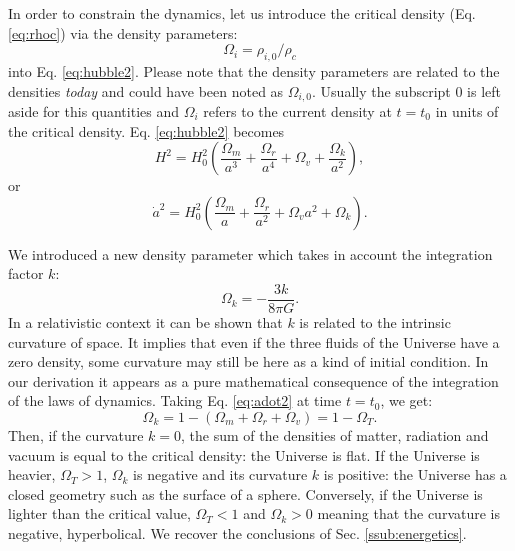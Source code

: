 In order to constrain the dynamics, let us introduce the critical density (Eq. \ref{eq:rhoc}) via the density parameters:
\begin{equation}
	\Omega_{i}=\rho_{i,0}/\rho_c
\end{equation}  
into Eq. \ref{eq:hubble2}. Please note that the density parameters are related to the densities \emph{today} and could have been noted as $\Omega_{i,0}$. Usually the subscript $0$ is left aside for this quantities and $\Omega_i$ refers to the current density at $t=t_0$ in units of the critical density. Eq. \ref{eq:hubble2} becomes
\begin{equation}
	H^2=H_0^2(\frac{\Omega_m}{a^3}+\frac{\Omega_r}{a^4}+\Omega_v+\frac{\Omega_k}{a^2}),
\end{equation}
or
\begin{equation}
	{\dot a}^2=H_0^2(\frac{\Omega_m}{a}+\frac{\Omega_r}{a^2}+{\Omega_v}{a^2}+\Omega_k).
	\label{eq:adot2}
\end{equation}

We introduced a new density parameter which takes in account the integration factor $k$:
\begin{equation}
	\Omega_k=-\frac{3k}{8\pi G}.
\end{equation}
In a relativistic context it can be shown that $k$ is related to the intrinsic curvature of space. It implies that even if the three fluids of the Universe have a zero density, some curvature may still be here as a kind of initial condition. In our derivation it appears as a pure mathematical consequence of the integration of the laws of dynamics. Taking Eq. \ref{eq:adot2} at time $t=t_0$, we get:
\begin{equation}
	\Omega_k=1-(\Omega_m+\Omega_r+\Omega_v)=1-\Omega_T.
\end{equation}
Then, if the curvature $k=0$, the sum of the densities of matter, radiation and vacuum is equal to the critical density: the Universe is flat. If the Universe is heavier, $\Omega_T>1$, $\Omega_k$ is negative and its curvature $k$ is positive: the Universe has a closed geometry such as the surface of a sphere. Conversely, if the Universe is lighter than the critical value, $\Omega_T<1$ and $\Omega_k>0$ meaning that the curvature is negative, hyperbolical. We recover the conclusions of Sec. \ref{ssub:energetics}.

